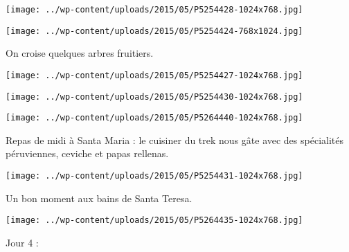  

\begin{center} \texttt{[image: ../wp-content/uploads/2015/05/P5254428-1024x768.jpg]} \end{center}

 

 

\begin{center} \texttt{[image: ../wp-content/uploads/2015/05/P5254424-768x1024.jpg]} \end{center}

 

 On croise quelques arbres fruitiers. 

 

\begin{center} \texttt{[image: ../wp-content/uploads/2015/05/P5254427-1024x768.jpg]} \end{center}

 

 

\begin{center} \texttt{[image: ../wp-content/uploads/2015/05/P5254430-1024x768.jpg]} \end{center}

 

 

\begin{center} \texttt{[image: ../wp-content/uploads/2015/05/P5264440-1024x768.jpg]} \end{center}

 

 Repas de midi à Santa Maria : le cuisiner du trek nous gâte avec des spécialités péruviennes, ceviche et papas rellenas. 

 

\begin{center} \texttt{[image: ../wp-content/uploads/2015/05/P5254431-1024x768.jpg]} \end{center}

 

 Un bon moment aux bains de Santa Teresa. 

 

\begin{center} \texttt{[image: ../wp-content/uploads/2015/05/P5264435-1024x768.jpg]} \end{center}

 

 Jour 4 : 

